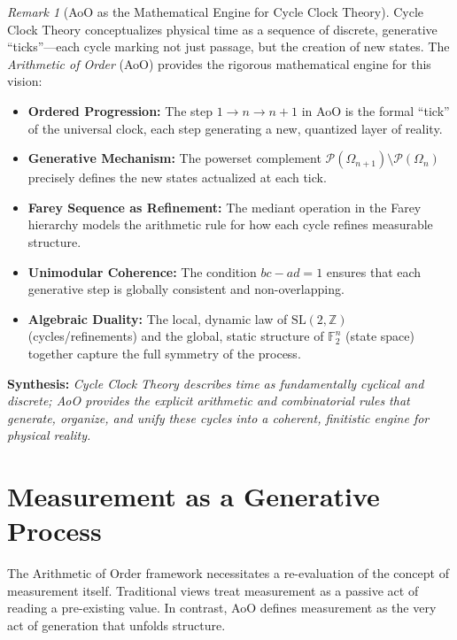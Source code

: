 \documentclass[12pt,a4paper]{article}
\theoremstyle{plain}
\theoremstyle{definition}
\theoremstyle{remark}
\newtheorem{remark}[theorem]{Remark}
\newcommand{\powerset}{\mathcal{P}}
\begin{document}
\begin{remark}[AoO as the Mathematical Engine for Cycle Clock Theory]
Cycle Clock Theory conceptualizes physical time as a sequence of discrete, generative “ticks”—each cycle marking not just passage, but the creation of new states. The \emph{Arithmetic of Order} (AoO) provides the rigorous mathematical engine for this vision:
\begin{itemize}
    \item \textbf{Ordered Progression:} The step $1 \to n \to n+1$ in AoO is the formal “tick” of the universal clock, each step generating a new, quantized layer of reality.
    \item \textbf{Generative Mechanism:} The powerset complement $\powerset(\Omega_{n+1}) \setminus \powerset(\Omega_n)$ precisely defines the new states actualized at each tick.
    \item \textbf{Farey Sequence as Refinement:} The mediant operation in the Farey hierarchy models the arithmetic rule for how each cycle refines measurable structure.
    \item \textbf{Unimodular Coherence:} The condition $bc - ad = 1$ ensures that each generative step is globally consistent and non-overlapping.
    \item \textbf{Algebraic Duality:} The local, dynamic law of $\mathrm{SL}(2,\mathbb{Z})$ (cycles/refinements) and the global, static structure of $\mathbb{F}_2^n$ (state space) together capture the full symmetry of the process.
\end{itemize}
\textbf{Synthesis:} \emph{Cycle Clock Theory describes time as fundamentally cyclical and discrete; AoO provides the explicit arithmetic and combinatorial rules that generate, organize, and unify these cycles into a coherent, finitistic engine for physical reality.}
\end{remark}

\section{Measurement as a Generative Process}
The Arithmetic of Order framework necessitates a re-evaluation of the concept of measurement itself. Traditional views treat measurement as a passive act of reading a pre-existing value. In contrast, AoO defines measurement as the very act of generation that unfolds structure.
\end{document}
